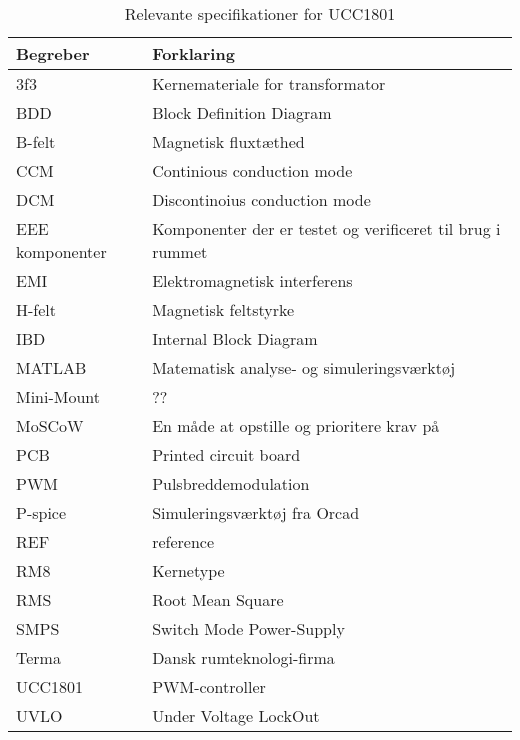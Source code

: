 \begin{table}[H] 			
	\centering
	\begin{tabularx}{\textwidth}{|X|l|} 
		\hline
		\textbf{Begreber} & \textbf{Forklaring} \\ \hline
		3f3 & Kernemateriale for transformator \\ \hline
		BDD & Block Definition Diagram \\ \hline
		B-felt & Magnetisk fluxtæthed \\ \hline
		CCM & Continious conduction mode \\ \hline
		DCM & Discontinoius conduction mode \\ \hline
		EEE komponenter & Komponenter der er testet og verificeret til brug i rummet \\ \hline
		EMI & Elektromagnetisk interferens \\ \hline
		H-felt & Magnetisk feltstyrke \\ \hline
		IBD & Internal Block Diagram \\ \hline
		MATLAB & Matematisk analyse- og simuleringsværktøj \\ \hline
		Mini-Mount & ?? \\ \hline
		MoSCoW & En måde at opstille og prioritere krav på \\ \hline
		PCB & Printed circuit board \\ \hline
		PWM & Pulsbreddemodulation \\ \hline
		P-spice & Simuleringsværktøj fra Orcad \\ \hline
		REF & reference \\ \hline
		RM8 & Kernetype \\ \hline
		RMS & Root Mean Square \\ \hline
		SMPS & Switch Mode Power-Supply \\ \hline
		Terma & Dansk rumteknologi-firma  \\ \hline
		UCC1801 & PWM-controller \\ \hline
		UVLO & Under Voltage LockOut \\ \hline
	\end{tabularx}
	
	\caption{Relevante specifikationer for UCC1801}
	\label{tab:ucc1801_specs}
\end{table}


